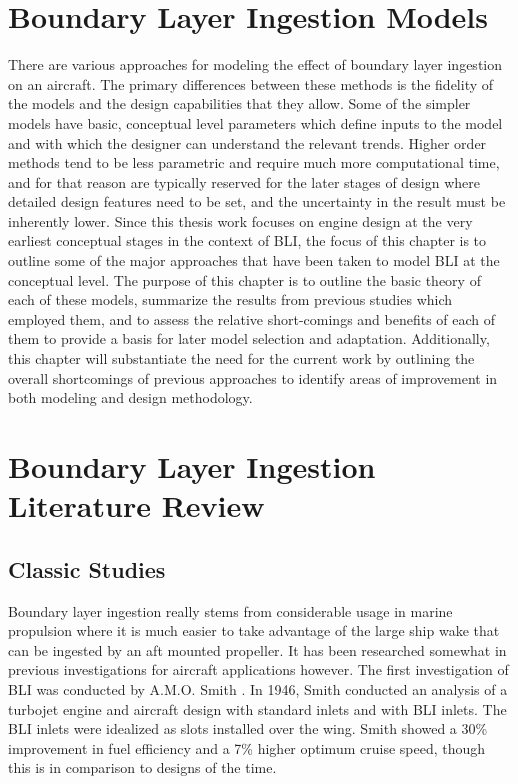 	\section{Boundary Layer Ingestion Models}
	
		There are various approaches for modeling the effect of boundary layer ingestion on an aircraft.  The primary differences between these methods is the fidelity of the models and the design capabilities that they allow.  Some of the simpler models have basic, conceptual level parameters which define inputs to the model and with which the designer can understand the relevant trends.  Higher order methods tend to be less parametric and require much more computational time, and for that reason are typically reserved for the later stages of design where detailed design features need to be set, and the uncertainty in the result must be inherently lower.  Since this thesis work focuses on engine design at the very earliest conceptual stages in the context of BLI, the focus of this chapter is to outline some of the major approaches that have been taken to model BLI at the conceptual level.  The purpose of this chapter is to outline the basic theory of each of these models, summarize the results from previous studies which employed them, and to assess the relative short-comings and benefits of each of them to provide a basis for later model selection and adaptation.  Additionally, this chapter will substantiate the need for the current work by outlining the overall shortcomings of previous approaches to identify areas of improvement in both modeling and design methodology.

	\section{Boundary Layer Ingestion Literature Review}
		\subsection{Classic Studies}
			Boundary layer ingestion really stems from considerable usage in marine propulsion where it is much easier to take advantage of the large ship wake that can be ingested by an aft mounted propeller.  It has been researched somewhat in previous investigations for aircraft applications however.  The first investigation of BLI was conducted by A.M.O. Smith \cite{Smith1947}.  In 1946, Smith conducted an analysis of a turbojet engine and aircraft design with standard inlets and with BLI inlets. The BLI inlets were idealized as slots installed over the wing.  Smith showed a 30\% improvement in fuel efficiency and a 7\% higher optimum cruise speed, though this is in comparison to designs of the time.
	
